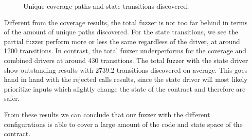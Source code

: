 \begin{figure}[!htbp]
    \centering
    \hfill
    \caption{Unique coverage paths and state transitions discovered.}
    \label{fig:path-trans}
\end{figure}

Different from the coverage results, the total fuzzer is not too far behind in terms of the amount of unique paths discovered.
For the state transitions, we see the partial fuzzer perform more or less the same regardless of the driver, at around 1200 transitions.
In contrast, the total fuzzer underperforms for the coverage and combined drivers at around 430 transitions.
The total fuzzer with the state driver show outstanding results with 2739.2 transitions discovered on average.
This goes hand in hand with the rejected calls results, since the state driver will most likely prioritize inputs which slightly change the state of the contract and therefore are safer.

From these results we can conclude that our fuzzer with the different configurations is able to cover a large amount of the code and state space of the contract.